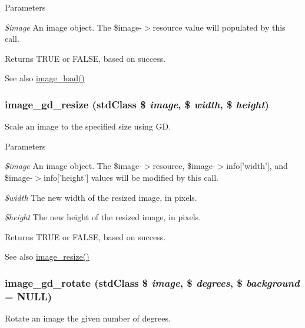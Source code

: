 \begin{DoxyParams}{Parameters}
\item[{\em \$image}]An image object. The \$image-\/$>$resource value will populated by this call. \end{DoxyParams}
\begin{DoxyReturn}{Returns}
TRUE or FALSE, based on success.
\end{DoxyReturn}
\begin{DoxySeeAlso}{See also}
\hyperlink{group__image_ga96098e5b039dc3906a656fa889a04776}{image\_\-load()} 
\end{DoxySeeAlso}
\hypertarget{group__image_ga8d0c1abb541e01ec7a76a57add14a0b2}{
\subsubsection[{image\_\-gd\_\-resize}]{\setlength{\rightskip}{0pt plus 5cm}image\_\-gd\_\-resize (stdClass \$ {\em image}, \/  \$ {\em width}, \/  \$ {\em height})}}
\label{group__image_ga8d0c1abb541e01ec7a76a57add14a0b2}
Scale an image to the specified size using GD.


\begin{DoxyParams}{Parameters}
\item[{\em \$image}]An image object. The \$image-\/$>$resource, \$image-\/$>$info\mbox{[}'width'\mbox{]}, and \$image-\/$>$info\mbox{[}'height'\mbox{]} values will be modified by this call. \item[{\em \$width}]The new width of the resized image, in pixels. \item[{\em \$height}]The new height of the resized image, in pixels. \end{DoxyParams}
\begin{DoxyReturn}{Returns}
TRUE or FALSE, based on success.
\end{DoxyReturn}
\begin{DoxySeeAlso}{See also}
\hyperlink{group__image_ga991594ed9388b740bc98a162b6bbc449}{image\_\-resize()} 
\end{DoxySeeAlso}
\hypertarget{group__image_gadfe1dec9bcb15c4b223acc64f35631d2}{
\subsubsection[{image\_\-gd\_\-rotate}]{\setlength{\rightskip}{0pt plus 5cm}image\_\-gd\_\-rotate (stdClass \$ {\em image}, \/  \$ {\em degrees}, \/  \$ {\em background} = {\ttfamily NULL})}}
\label{group__image_gadfe1dec9bcb15c4b223acc64f35631d2}
Rotate an image the given number of degrees.


